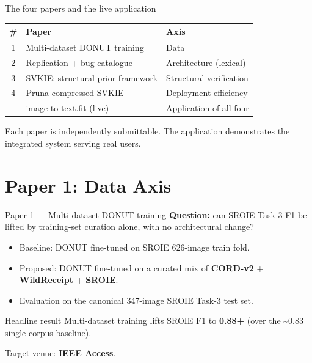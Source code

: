 \documentclass{beamer}
\begin{document}
\begin{frame}{The four papers and the live application}
  \begin{center}
  \begin{tabular}{cll}
    \toprule
    \# & Paper & Axis \\ \midrule
    1 & Multi-dataset DONUT training        & Data \\
    2 & Replication + bug catalogue         & Architecture (lexical) \\
    3 & SVKIE: structural-prior framework   & Structural verification \\
    4 & Pruna-compressed SVKIE              & Deployment efficiency \\
    \midrule
    -- & \href{https://image-to-text.fit/}{image-to-text.fit} (live) & Application of all four \\
    \bottomrule
  \end{tabular}
  \end{center}
  \vspace{1em}
  Each paper is independently submittable.  The application demonstrates
  the integrated system serving real users.
\end{frame}

\section{Paper 1: Data Axis}
\begin{frame}{Paper 1 --- Multi-dataset DONUT training}
  \textbf{Question:} can SROIE Task-3 F1 be lifted by training-set
  curation alone, with no architectural change?
  \vspace{0.5em}
  \begin{itemize}
    \item Baseline: DONUT fine-tuned on SROIE 626-image train fold.
    \item Proposed: DONUT fine-tuned on a curated mix of
          \textbf{CORD-v2} + \textbf{WildReceipt} + \textbf{SROIE}.
    \item Evaluation on the canonical 347-image SROIE Task-3 test set.
  \end{itemize}
  \begin{block}{Headline result}
    Multi-dataset training lifts SROIE F1 to \textbf{0.88+} (over the
    \textasciitilde{}0.83 single-corpus baseline).
  \end{block}
  Target venue: \textbf{IEEE Access}.
\end{frame}
\end{document}
